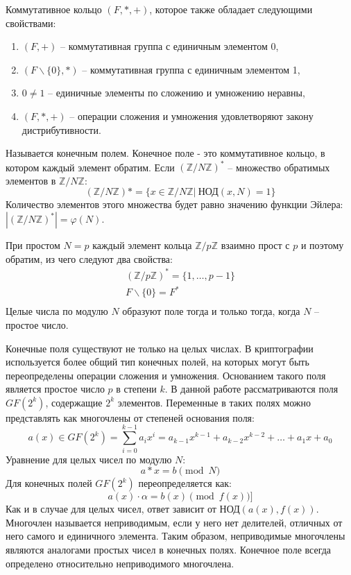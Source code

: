\documentclass[times,specification,annotation]{itmo-student-thesis}
\begin{document}
Коммутативное кольцо $(F,*,+)$, которое также обладает следующими свойствами:
\begin{enumerate}[label=\arabic*.]
    \item $(F,+)$ -- коммутативная группа с единичным элементом 0,
    \item $(F \backslash \{0\},*)$ -- коммутативная группа с единичным элементом 1,
    \item $0\neq1$ -- единичные элементы по сложению и умножению неравны,
    \item $(F,*,+)$ -- операции сложения и умножения удовлетворяют закону дистрибутивности.
\end{enumerate}
Называется конечным полем.
Конечное поле - это коммутативное кольцо, в котором каждый элемент обратим.
Если $(\mathbb{Z}/N\mathbb{Z})^*$ -- множество обратимых элементов в $\mathbb{Z}/N\mathbb{Z}$:
\[(\mathbb{Z}/N\mathbb{Z})* = \{x \in \mathbb{Z}/N\mathbb{Z} | ~ \text{НОД}(x, N) = 1\}\]
Количество элементов этого множества будет равно значению функции Эйлера:
$|(\mathbb{Z}/N\mathbb{Z})^*| = \varphi (N)$.

При простом $N=p$ каждый элемент кольца $\mathbb{Z}/p\mathbb{Z}$ взаимно прост с $p$ и поэтому обратим,
из чего следуют два свойства:
\begin{gather*}
    (\mathbb{Z}/p\mathbb{Z})^* = \{1, \dots, p-1\}\\
    F \backslash \{0\} = F^*\\
\end{gather*}
Целые числа по модулю $N$ образуют поле тогда и только тогда, когда $N$ -- простое число.

Конечные поля существуют не только на целых числах.
В криптографии используется более общий тип конечных полей, на которых могут быть переопределены операции сложения и умножения.
Основанием такого поля является простое число $p$ в степени $k$.
В данной работе рассматриваются поля $GF (2^k)$, содержащие $2^k$ элементов.
Переменные в таких полях можно представлять как многочлены от степеней основания поля:
\[a(x) \in GF(2^k) = \sum_{i=0}^{k-1}a_i x^i = a_{k-1}x^{k-1} + a_{k-2}x^{k-2} + \dots + a_1 x + a_0\]
Уравнение для целых чисел по модулю $N$:
\[a*x = b \pmod{N}\]
Для конечных полей $GF(2^k)$ переопределяется как:
\[a(x) \cdot \alpha = b(x) \pmod{f(x)}]\]
Как и в случае для целых чисел, ответ зависит от НОД$(a(x), f(x))$.
Многочлен называется неприводимым, если у него нет делителей, отличных от него самого и единичного элемента.
Таким образом, неприводимые многочлены являются аналогами простых чисел в конечных полях.
Конечное поле всегда определено относительно неприводимого многочлена.
\end{document}
